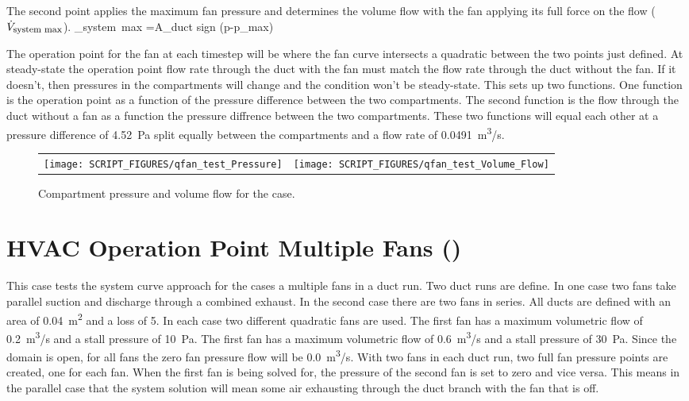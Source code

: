 \documentclass[11pt]{book}
\begin{document}
The second point applies the maximum fan pressure and determines the volume flow with the fan applying its full force on the flow ($\dot{V}_{\hbox{\footnotesize system max}}$).
\be
{}_{\hbox{\footnotesize system max}} =A_{\hbox{\footnotesize duct}} \hbox{sign} (\Delta p-\Delta p_{\hbox{\footnotesize max}}) 
\ee

The operation point for the fan at each timestep will be where the fan curve intersects a quadratic between the two points just defined. At steady-state the operation point flow rate through the duct with the fan must match the flow rate through the duct without the fan. If it doesn't, then pressures in the compartments will change and the condition won't be steady-state. This sets up two functions. One function is the operation point as a function of the pressure difference between the two compartments. The second function is the flow through the duct without a fan as a function the pressure diffrence between the two compartments. These two functions will equal each other at a pressure difference of 4.52~Pa split equally between the compartments and a flow rate of 0.0491~\si{m^3/s}.

\begin{figure}[ht]
    \begin{tabular*}{\textwidth}{lr}
        \texttt{[image: SCRIPT\_FIGURES/qfan\_test\_Pressure]} &
        \texttt{[image: SCRIPT\_FIGURES/qfan\_test\_Volume\_Flow]}
    \end{tabular*}
    \caption[Results of the  case]{Compartment pressure and volume flow for the  case.}
    \label{qfan_test_fig}
\end{figure}

\section{HVAC Operation Point Multiple Fans (\texorpdfstring{}{qfan\_multi})}
\label{qfan_multi}

This case tests the system curve approach for the cases a multiple fans in a duct run. Two duct runs are define. In one case two fans take parallel suction and discharge through a combined exhaust. In the second case there are two fans in series. All ducts are defined with an area of 0.04~\si{m^2} and a loss of 5. In each case two different quadratic fans are used. The first fan has a maximum volumetric flow of 0.2~\si{m^3/s} and a stall pressure of 10~Pa. The first fan has a maximum volumetric flow of 0.6~\si{m^3/s} and a stall pressure of 30~Pa. Since the domain is open, for all fans the zero fan pressure flow will be 0.0~\si{m^3/s}. With two fans in each duct run, two full fan pressure points are created, one for each fan. When the first fan is being solved for, the pressure of the second fan is set to zero and vice versa. This means in the parallel case that the system solution will mean some air exhausting through the duct branch with the fan that is off.
\end{document}
